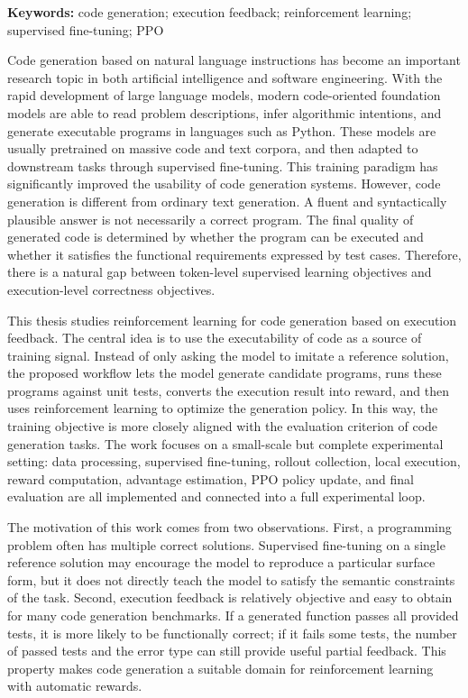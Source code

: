 
\begin{digest}
\noindent\textbf{Keywords:} code generation; execution feedback; reinforcement learning; supervised fine-tuning; PPO

\vspace{1em}

Code generation based on natural language instructions has become an important research topic in both artificial intelligence and software engineering. With the rapid development of large language models, modern code-oriented foundation models are able to read problem descriptions, infer algorithmic intentions, and generate executable programs in languages such as Python. These models are usually pretrained on massive code and text corpora, and then adapted to downstream tasks through supervised fine-tuning. This training paradigm has significantly improved the usability of code generation systems. However, code generation is different from ordinary text generation. A fluent and syntactically plausible answer is not necessarily a correct program. The final quality of generated code is determined by whether the program can be executed and whether it satisfies the functional requirements expressed by test cases. Therefore, there is a natural gap between token-level supervised learning objectives and execution-level correctness objectives.

This thesis studies reinforcement learning for code generation based on execution feedback. The central idea is to use the executability of code as a source of training signal. Instead of only asking the model to imitate a reference solution, the proposed workflow lets the model generate candidate programs, runs these programs against unit tests, converts the execution result into reward, and then uses reinforcement learning to optimize the generation policy. In this way, the training objective is more closely aligned with the evaluation criterion of code generation tasks. The work focuses on a small-scale but complete experimental setting: data processing, supervised fine-tuning, rollout collection, local execution, reward computation, advantage estimation, PPO policy update, and final evaluation are all implemented and connected into a full experimental loop.

The motivation of this work comes from two observations. First, a programming problem often has multiple correct solutions. Supervised fine-tuning on a single reference solution may encourage the model to reproduce a particular surface form, but it does not directly teach the model to satisfy the semantic constraints of the task. Second, execution feedback is relatively objective and easy to obtain for many code generation benchmarks. If a generated function passes all provided tests, it is more likely to be functionally correct; if it fails some tests, the number of passed tests and the error type can still provide useful partial feedback. This property makes code generation a suitable domain for reinforcement learning with automatic rewards.


\end{digest}
